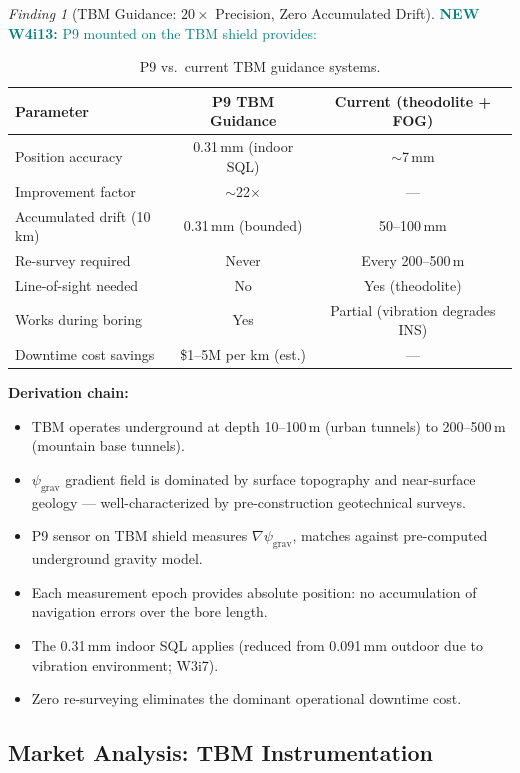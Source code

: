 \documentclass[11pt]{article}
\theoremstyle{definition}
\theoremstyle{remark}
\newtheorem{finding}[theorem]{Finding}
\newcommand{\psigrav}{\psi_{\mathrm{grav}}}
\newcommand{\newfinding}[1]{\textcolor{teal}{\textbf{NEW W4i13:} #1}}
\begin{document}
\begin{finding}[TBM Guidance: $20\times$ Precision, Zero Accumulated Drift]
\label{find:tbm-guidance}
\newfinding{P9 mounted on the TBM shield provides:}

\begin{table}[H]
\centering
\caption{P9 vs.\ current TBM guidance systems.}
\label{tab:tbm-comparison}
\begin{tabular}{@{}lcc@{}}
\toprule
Parameter & P9 TBM Guidance & Current (theodolite + FOG) \\
\midrule
Position accuracy & 0.31\,mm (indoor SQL) & $\sim$7\,mm \\
Improvement factor & $\sim$22$\times$ & --- \\
Accumulated drift (10\,km) & 0.31\,mm (bounded) & 50--100\,mm \\
Re-survey required & Never & Every 200--500\,m \\
Line-of-sight needed & No & Yes (theodolite) \\
Works during boring & Yes & Partial (vibration degrades INS) \\
Downtime cost savings & \$1--5M per km (est.) & --- \\
\bottomrule
\end{tabular}
\end{table}

\textbf{Derivation chain:}
\begin{itemize}[nosep]
\item TBM operates underground at depth 10--100\,m (urban tunnels) to
  200--500\,m (mountain base tunnels).
\item $\psigrav$ gradient field is dominated by surface topography and
  near-surface geology --- well-characterized by pre-construction
  geotechnical surveys.
\item P9 sensor on TBM shield measures $\nabla\psigrav$, matches against
  pre-computed underground gravity model.
\item Each measurement epoch provides absolute position: no accumulation
  of navigation errors over the bore length.
\item The 0.31\,mm indoor SQL applies (reduced from 0.091\,mm outdoor due
  to vibration environment; W3i7).
\item Zero re-surveying eliminates the dominant operational downtime cost.
\end{itemize}
\end{finding}

\subsection{Market Analysis: TBM Instrumentation}
\end{document}
